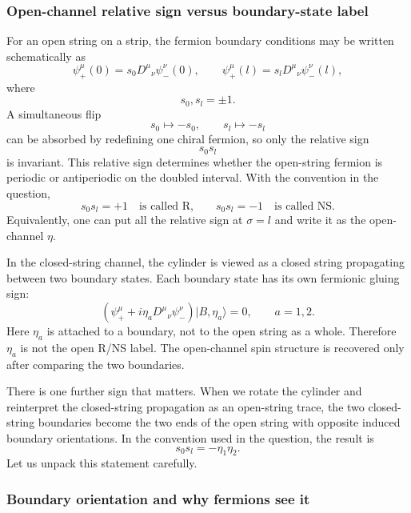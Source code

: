 \documentclass[
  10pt,
  a4paper,
  openany]{book}
\begin{document}
\subsubsection{Open-channel relative sign versus boundary-state
label}\label{open-channel-relative-sign-versus-boundary-state-label}

For an open string on a strip, the fermion boundary conditions may be
written schematically as \[
\psi_+^\mu(0)=s_0D^\mu{}_\nu\psi_-^\nu(0),
\qquad
\psi_+^\mu(l)=s_lD^\mu{}_\nu\psi_-^\nu(l),
\] where \[
s_0,s_l=\pm 1.
\] A simultaneous flip \[
s_0\mapsto -s_0,
\qquad
s_l\mapsto -s_l
\] can be absorbed by redefining one chiral fermion, so only the
relative sign \[
s_0s_l
\] is invariant. This relative sign determines whether the open-string
fermion is periodic or antiperiodic on the doubled interval. With the
convention in the question, \[
s_0s_l=+1
\quad\text{is called R,}
\qquad
s_0s_l=-1
\quad\text{is called NS.}
\] Equivalently, one can put all the relative sign at \(\sigma=l\) and
write it as the open-channel \(\eta\).

In the closed-string channel, the cylinder is viewed as a closed string
propagating between two boundary states. Each boundary state has its own
fermionic gluing sign: \[
\left(\psi_+^\mu+i\eta_aD^\mu{}_\nu\psi_-^\nu\right)|B,\eta_a\rangle=0,
\qquad
a=1,2.
\] Here \(\eta_a\) is attached to a boundary, not to the open string as
a whole. Therefore \(\eta_a\) is not the open R/NS label. The
open-channel spin structure is recovered only after comparing the two
boundaries.

There is one further sign that matters. When we rotate the cylinder and
reinterpret the closed-string propagation as an open-string trace, the
two closed-string boundaries become the two ends of the open string with
opposite induced boundary orientations. In the convention used in the
question, the result is \[
s_0s_l=-\eta_1\eta_2.
\] Let us unpack this statement carefully.

\subsubsection{Boundary orientation and why fermions see
it}\label{boundary-orientation-and-why-fermions-see-it}
\end{document}
